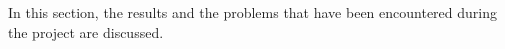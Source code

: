 In this section, the results and the problems that have been encountered during the project are discussed.
